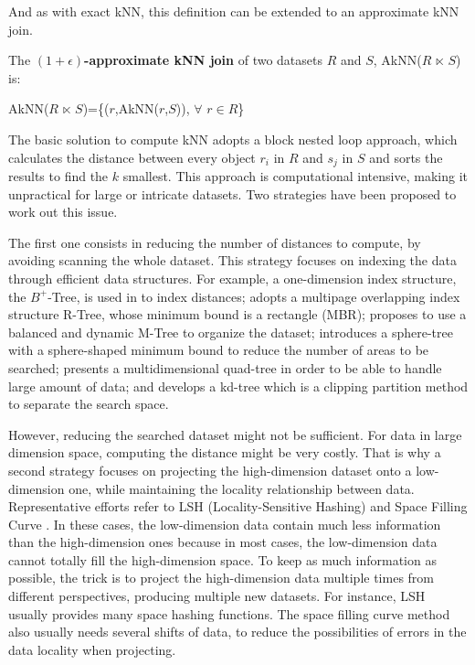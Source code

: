 And as with exact kNN, this definition can be extended to an approximate kNN join. 
\begin{myDef}
    The \textbf{$\left(1+\epsilon\right)$-approximate kNN join} of two datasets $R$ and $S$, AkNN($R$ $\ltimes$ $S$) is:
	\begin{center}
	AkNN($R$ $\ltimes$ $S$)=\{($r$,AkNN($r$,$S$)), $\forall$ $r \in R$\}
	\end{center}	    
\end{myDef}


The basic solution to compute kNN adopts a block nested loop approach, which calculates the distance between every object $r_i$ in $R$ and $s_j$ in $S$ and 
sorts the results to find the $k$ smallest. This approach is computational intensive, making it unpractical for large or intricate datasets. Two
strategies have been proposed to work out this issue.  

The first one consists in reducing the number of distances to compute, by avoiding scanning the whole dataset. This strategy focuses on indexing the 
data through efficient data structures. For example, a one-dimension index structure, the $B^+$-Tree, is used in \cite{DBLP:journals/tods/JagadishOTYZ05} to index distances; 
\cite{MuX} adopts a multipage overlapping index structure R-Tree, whose minimum bound is a rectangle (MBR); \cite{Ciaccia:1997:MEA:645923.671005} 
proposes to use a balanced and dynamic M-Tree to organize the dataset; \cite{Yu:2010:HKJ:1713160.1713227} introduces a sphere-tree with a sphere-shaped minimum bound to reduce the number of areas to be searched; \cite{Andreica13sequentialand} presents a multidimensional quad-tree in order to be able to handle large 
amount of data; and \cite{Bentley:1975:MBS:361002.361007} develops a kd-tree which is a  clipping partition method to separate the search space.


However, reducing the searched dataset might not be sufficient. For data in large dimension space, computing the distance might 
be very costly. That is why a second strategy focuses on projecting the high-dimension dataset onto a low-dimension one, while maintaining the 
locality relationship between data. Representative efforts refer to LSH (Locality-Sensitive Hashing) \cite{Datar:2004:LHS:997817.997857} and 
Space  Filling Curve \cite{5447837}.
In these cases, the low-dimension data contain much less information than the high-dimension ones
because in most cases, the low-dimension data cannot totally fill the high-dimension space. To keep as much information as possible, the trick is to project the high-dimension data multiple times from different perspectives, producing multiple new
datasets.
For instance, LSH usually provides many space hashing functions. The space filling curve method also usually needs several shifts 
of data, to reduce the possibilities of errors in the data locality when projecting. 

